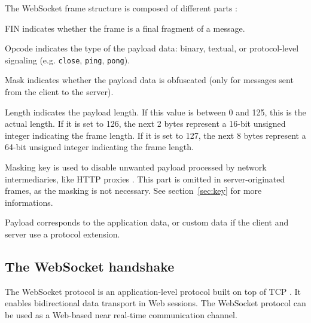 \documentclass[10pt,journal,compsoc]{IEEEtran}
\newcommand{\ttt}[1]{\texttt{#1}}
\newcommand{\ws}{WebSocket}
\begin{document}
The \ws{} frame structure is composed of different parts \cite{HighPerfBrowserNetworking:websocket} \cite{performanceEvaluationOfWebsocketProtocol} :
\begin{LaTeXdescription}    %
    \item[FIN] indicates whether the frame is a final fragment of a message.
    \item[Opcode] indicates the type of the payload data: binary, textual, or protocol-level signaling (e.g. \ttt{close}, \ttt{ping}, \ttt{pong}).
    \item[Mask] indicates whether the payload data is obfuscated (only for messages sent from the client to the server).
    \item[Length] indicates the payload length. If this value is between 0 and 125, this is the actual length.
                    If it is set to 126, the next 2 bytes represent a 16-bit unsigned integer indicating the frame length.
                    If it is set to 127, the next 8 bytes represent a 64-bit unsigned integer indicating the frame length.
    \item[Masking key] is used to disable unwanted payload processed by network intermediaries, like HTTP proxies \cite{performanceEvaluationOfWebsocketProtocol}.
                    This part is omitted in server-originated frames, as the masking is not necessary. See section~\ref{sec:key} for more informations.
    \item[Payload] corresponds to the application data, or custom data if the client and server use a protocol extension.
\end{LaTeXdescription}




\subsection{The \ws{} handshake}
\label{handshake}
The \ws{} protocol is an application-level protocol built on top of TCP \cite{rfc6455}.
It enables bidirectional data transport in Web sessions.
The \ws{} protocol can be used as a Web-based near real-time communication channel.
\end{document}
